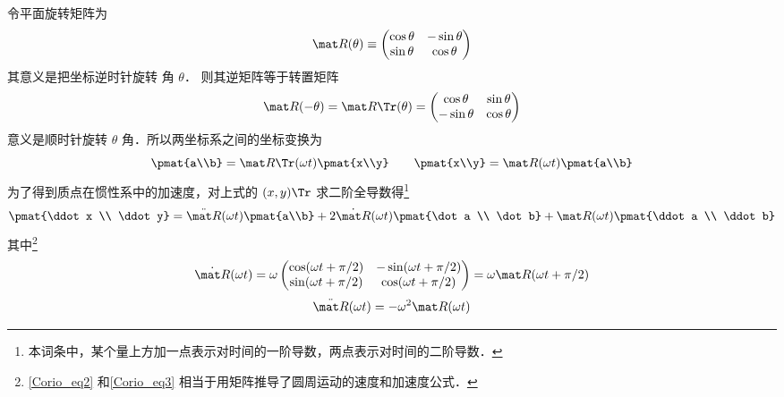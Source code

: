 令平面旋转矩阵为%
\begin{equation}
\mat R(\theta) \equiv \begin{pmatrix}
\cos \theta & - \sin \theta \\
\sin \theta & \cos \theta
\end{pmatrix}
\end{equation}
其意义是把坐标逆时针旋转 角 $\theta$．
则其逆矩阵等于转置矩阵
\begin{equation}
\mat R(- \theta) = \mat R\Tr (\theta) =  \begin{pmatrix}
\cos \theta &\sin \theta \\
 - \sin \theta &\cos \theta
\end{pmatrix}
\end{equation}
意义是顺时针旋转 $\theta$ 角．所以两坐标系之间的坐标变换为
\begin{equation}
\pmat{a\\b} = \mat R\Tr (\omega t) \pmat{x\\y}
\qquad
\pmat{x\\y} = \mat R(\omega t) \pmat{a\\b}
\end{equation}
为了得到质点在惯性系中的加速度，对上式的 $(x,y)\Tr$ 求二阶全导数得\footnote{本词条中，某个量上方加一点表示对时间的一阶导数，两点表示对时间的二阶导数．}
\begin{equation}\label{Corio_eq1}
\pmat{\ddot x \\ \ddot y} = 
\ddot{\mat R}(\omega t) \pmat{a\\b} + 2\dot{\mat R} (\omega t) \pmat{\dot a \\ \dot b} + \mat R(\omega t)\pmat{\ddot a \\ \ddot b}
\end{equation}
其中\footnote{\autoref{Corio_eq2} 和\autoref{Corio_eq3} 相当于用矩阵推导了圆周运动的速度和加速度公式．}
\begin{equation}\label{Corio_eq2}
\dot{\mat R}(\omega t) = \omega \begin{pmatrix}
\cos(\omega t + \pi /2) &  - \sin(\omega t + \pi /2)\\
\sin(\omega t + \pi /2) & \cos(\omega t + \pi /2)
\end{pmatrix}
= \omega \mat R(\omega t + \pi /2)
\end{equation}
\begin{equation}\label{Corio_eq3}
\ddot{\mat R} (\omega t)  =  - \omega ^2 \mat R (\omega t)
\end{equation}
